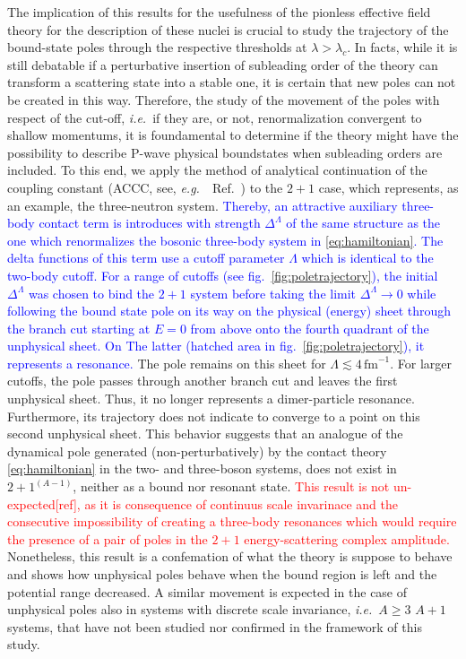 \documentclass[preprint,12pt]{elsarticle}
\newcommand{\lc}{\ensuremath{\lambda_c}}
\newcommand{\fm}{\ensuremath{\,\text{fm}^{-1}}}
\newcommand{\abb}{\ensuremath{2\!+\!1^{(A-1)}}}
\newcommand{\red}[1]{\textcolor{red}{#1}}
\newcommand{\blue}[1]{\textcolor{blue}{#1}}
\newcommand{\eg}{\textit{e.g.}~}
\newcommand{\ie}{\textit{i.e.}~}
\newcommand{\figref}[1]{fig.~\ref{#1}}
\begin{document}
The implication of this results for the usefulness of the pionless effective field theory for the description of these nuclei is crucial to study the trajectory of the bound-state poles through the respective thresholds at $\lambda > \lc$.
In facts, while it is still debatable if a perturbative insertion of subleading order of the theory can transform a scattering state into a stable one, it is certain that new poles can not be created in this way.
Therefore, the study of the movement of the poles with respect of the cut-off, \ie if they are, or not, renormalization convergent to shallow momentums, it is foundamental to determine if the theory might have the possibility to describe P-wave physical boundstates when subleading orders are included.
To this end, we apply the method of analytical continuation of the coupling constant (ACCC, see, \eg~Ref.~\cite{Kukulin_1977}) to the $2+1$ case, which represents, as an example, the three-neutron system.
\blue{Thereby, an attractive auxiliary three-body contact term is introduces with strength $\Delta^\Lambda$ of the same structure as the one which renormalizes the bosonic three-body system in \eqref{eq:hamiltonian}. 
The delta functions of this term use a cutoff parameter $\Lambda$ which is identical to the two-body cutoff. 
For a range of cutoffs (see \figref{fig:poletrajectory}), the initial $\Delta^\Lambda$ was chosen to bind the $2+1$ system before taking the limit $\Delta^\Lambda\to 0$ while following the bound state pole on its way on the physical (energy) sheet through the branch cut starting at $E=0$ from above onto the fourth quadrant of the unphysical sheet. On The latter (hatched area in \figref{fig:poletrajectory}), it represents a resonance. }
The pole remains on this sheet for $\Lambda\lesssim4\fm$. 
For larger cutoffs, the pole passes through another branch cut and leaves the first unphysical sheet. 
Thus, it no longer represents a dimer-particle resonance. 
Furthermore, its trajectory does not indicate to converge to a point on this second unphysical sheet. 
This behavior suggests that an analogue of the dynamical pole generated (non-perturbatively) by the contact theory \eqref{eq:hamiltonian} in the two- and three-boson systems, does not exist in \abb, neither as a bound nor resonant state.
\red{This result is not un-expected[ref], as it is consequence of continuus scale invarinace and the consecutive impossibility of creating a three-body resonances which would require the presence of a pair of poles in the $2+1$ energy-scattering complex amplitude.}
Nonetheless, this result is a confemation of what the theory is suppose to behave and shows how unphysical poles behave when the bound region is left and the potential range decreased.
A similar movement is expected in the case of unphysical poles also in systems with discrete scale invariance, \ie $A\geq3$ $A+1$ systems, that have not been studied nor confirmed in the framework of this study.
\end{document}
